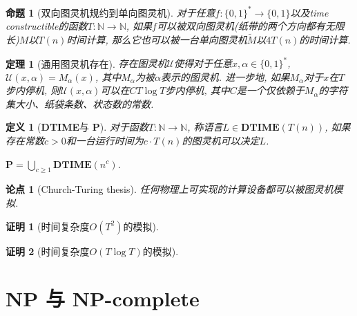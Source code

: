\documentclass[8pt]{article}
\theoremstyle{compact}
\newtheorem{theorem}{定理}
\newtheorem{definition}{定义}
\newtheorem{proposition}{命题}
\newtheorem{thesis}{论点}
\newtheorem{Proof}{证明}
\def\ge{\geqslant}
\def\DTIME{\textbf{DTIME}}
\def\P{\textbf{P}}
\begin{document}
\begin{proposition}[双向图灵机规约到单向图灵机]
	对于任意$f: \{0, 1\}^* \to \{0, 1\}$以及time constructible的函数$T: \mathbb{N} \to \mathbb{N}$, 如果$f$可以被双向图灵机(纸带的两个方向都有无限长)$M$以$T(n)$时间计算, 那么它也可以被一台单向图灵机$\tilde{M}$以$4T(n)$的时间计算. 
\end{proposition}
\begin{theorem}[通用图灵机存在]
	存在图灵机$\mathcal U$使得对于任意$x, \alpha \in \{0, 1\}^*$, $\mathcal U(x, \alpha) = M_{\alpha}(x)$, 其中$M_{\alpha}$为被$\alpha$表示的图灵机. 进一步地, 如果$M_{\alpha}$对于$x$在$T$步内停机, 则$\mathcal U(x, \alpha)$可以在$CT\log T$步内停机, 其中$C$是一个仅依赖于$M_{\alpha}$的字符集大小、纸袋条数、状态数的常数. 
\end{theorem}
\begin{definition}[\DTIME 与 \P]
	对于函数$T: \mathbb N \to \mathbb N$, 称语言$L \in \DTIME(T(n))$, 如果存在常数$c > 0$和一台运行时间为$c \cdot T(n)$的图灵机可以决定$L$. 

	$\P = \bigcup_{c \ge 1}\DTIME(n^c)$. 
\end{definition}
\begin{thesis}[Church-Turing thesis]
	任何物理上可实现的计算设备都可以被图灵机模拟. 
\end{thesis}

\begin{Proof}[时间复杂度$O(T^2)$的模拟]
	
\end{Proof}
\begin{Proof}[时间复杂度$O(T  \log T)$的模拟]
	
\end{Proof}


\newpage
\section{NP 与 NP-complete}
\end{document}
